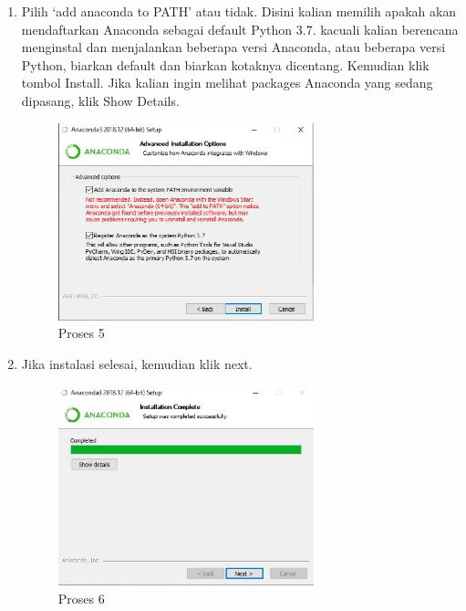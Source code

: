 \begin{itemize}
\begin{enumerate}
\item Pilih ‘add anaconda to PATH’ atau tidak. Disini kalian memilih apakah akan mendaftarkan Anaconda sebagai default Python 3.7. kacuali kalian berencana menginstal dan menjalankan beberapa versi Anaconda, atau beberapa versi Python, biarkan default dan biarkan kotaknya dicentang. Kemudian klik tombol Install. Jika kalian ingin melihat packages Anaconda yang sedang dipasang, klik Show Details.
\begin{figure}[ht]
	\centerline{\includegraphics[width=0.70\textwidth]{figures/1/1154121/e.JPG}}
	\caption{Proses 5 }
	\label{gambar5 }
\end{figure}

\item Jika instalasi selesai, kemudian klik next.
\begin{figure}[ht]
	\centerline{\includegraphics[width=0.70\textwidth]{figures/1/1154121/f.JPG}}
	\caption{Proses 6 }
	\label{gambar6 }
\end{figure}


\end{enumerate}
\end{itemize}

